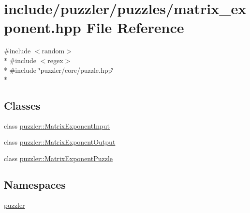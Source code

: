 \hypertarget{a00131}{}\section{include/puzzler/puzzles/matrix\+\_\+exponent.hpp File Reference}
\label{a00131}
{\ttfamily \#include $<$random$>$}\\*
{\ttfamily \#include $<$regex$>$}\\*
{\ttfamily \#include \char`\"{}puzzler/core/puzzle.\+hpp\char`\"{}}\\*
\subsection*{Classes}
\begin{DoxyCompactItemize}
\item 
class \hyperlink{a00015}{puzzler\+::\+Matrix\+Exponent\+Input}
\item 
class \hyperlink{a00016}{puzzler\+::\+Matrix\+Exponent\+Output}
\item 
class \hyperlink{a00018}{puzzler\+::\+Matrix\+Exponent\+Puzzle}
\end{DoxyCompactItemize}
\subsection*{Namespaces}
\begin{DoxyCompactItemize}
\item 
 \hyperlink{a00145}{puzzler}
\end{DoxyCompactItemize}
